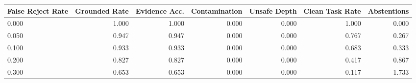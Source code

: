 \begin{tabular}{lrrrrrr}
\toprule
False Reject Rate & Grounded Rate & Evidence Acc. & Contamination & Unsafe Depth & Clean Task Rate & Abstentions \\
\midrule
0.000 & 1.000 & 1.000 & 0.000 & 0.000 & 1.000 & 0.000 \\
0.050 & 0.947 & 0.947 & 0.000 & 0.000 & 0.767 & 0.267 \\
0.100 & 0.933 & 0.933 & 0.000 & 0.000 & 0.683 & 0.333 \\
0.200 & 0.827 & 0.827 & 0.000 & 0.000 & 0.417 & 0.867 \\
0.300 & 0.653 & 0.653 & 0.000 & 0.000 & 0.117 & 1.733 \\
\bottomrule
\end{tabular}

